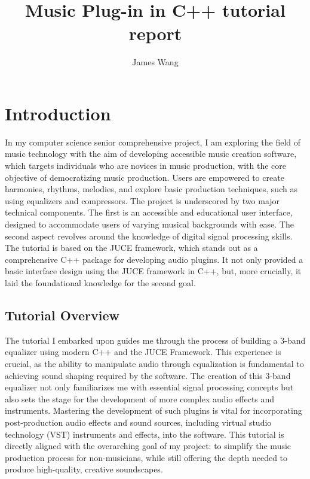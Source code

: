 \documentclass[10pt,twocolumn]{article}
\title{Music Plug-in in C++ tutorial report}
\author{James Wang}
\affiliation{Occidental College}
\begin{document}
\maketitle

\section{Introduction}

In my computer science senior comprehensive project, I am exploring the field of music technology with the aim of developing accessible music creation software, which targets individuals who are novices in music production, with the core objective of democratizing music production. Users are empowered to create harmonies, rhythms, melodies, and explore basic production techniques, such as using equalizers and compressors. 
The project is underscored by two major technical components. The first is an accessible and educational user interface, designed to accommodate users of varying musical backgrounds with ease. The second aspect revolves around the knowledge of digital signal processing skills. The tutorial is based on the JUCE framework, which stands out as a comprehensive C++ package for developing audio plugins. It not only provided a basic interface design using the JUCE framework in C++, but, more crucially, it laid the foundational knowledge for the second goal. 

\subsection{Tutorial Overview}
The tutorial\cite{YouTubeVideo2023} I embarked upon guides me through the process of building a 3-band equalizer using modern C++ and the JUCE Framework. This experience is crucial, as the ability to manipulate audio through equalization is fundamental to achieving sound shaping required by the software. The creation of this 3-band equalizer not only familiarizes me with essential signal processing concepts but also sets the stage for the development of more complex audio effects and instruments. Mastering the development of such plugins is vital for incorporating post-production audio effects and sound sources, including virtual studio technology (VST) instruments and effects, into the software. This tutorial is directly aligned with the overarching goal of my project: to simplify the music production process for non-musicians, while still offering the depth needed to produce high-quality, creative soundscapes.
\end{document}
